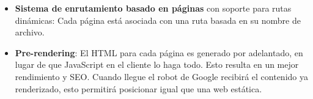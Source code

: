 \documentclass[12pt,twoside,titlepage]{report}
\begin{document}
\begin{itemize}
    \item \textbf{Sistema de enrutamiento basado en páginas} con soporte para rutas dinámicas: Cada página está asociada con una ruta basada en su nombre de archivo. 

    \item \textbf{Pre-rendering}: El HTML para cada página es generado por adelantado, en lugar de que JavaScript en el cliente lo haga todo. Esto resulta en un mejor rendimiento y SEO. Cuando llegue el robot de Google recibirá el contenido ya renderizado, esto permitirá posicionar igual que una web estática. 

\end{itemize}
\end{document}
